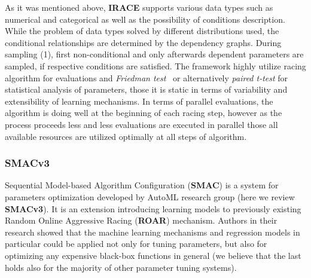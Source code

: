 As it was mentioned above, \textbf{IRACE} supports various data types such as numerical and categorical as well as the possibility of conditions description. While the problem of data types solved by different distributions used, the conditional relationships are determined by the dependency graphs. During sampling (1), first non-conditional and only afterwards dependent parameters are sampled, if respective conditions are satisfied. The framework highly utilize racing algorithm for evaluations and \textit{Friedman test}~\cite{conover1980practical} or alternatively \textit{paired t-test} for statistical analysis of parameters, those it is static in terms of variability and extensibility of learning mechanisms. In terms of parallel evaluations, the algorithm is doing well at the beginning of each racing step, however as the process proceeds less and less evaluations are executed in parallel those all available resources are utilized optimally at all steps of algorithm.


\subsubsection{SMACv3~\cite{hutter2011sequential}}\label{bg: smac}
Sequential Model-based Algorithm Configuration (\textbf{SMAC}) is a system for parameters optimization developed by AutoML research group (here we review \textbf{SMACv3}). It is an extension introducing learning models to previously existing Random Online Aggressive Racing (\textbf{ROAR}) mechanism. Authors in their research showed that the machine learning mechanisms and regression models in particular could be applied not only for tuning parameters, but also for optimizing any expensive black-box functions in general (we believe that the last holds also for the majority of other parameter tuning systems). 

